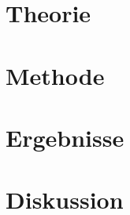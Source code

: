 \section{Theorie}\label{sec:Theorie}


\section{Methode}\label{sec:Methode}


\section{Ergebnisse}\label{sec:Ergebnisse}


\section{Diskussion}\label{sec:Diskussion}


\begin{flushleft}
\nocite{}
{}
\end{flushleft}






%
%
%